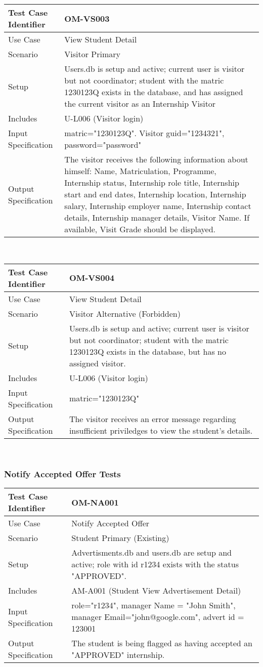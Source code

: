 \documentclass{l3deliverable}
\begin{document}
\begin{tabular}{lp{10cm}}
\hline 
\textbf{Test Case Identifier} & OM-VS003\tabularnewline
\hline 
\hline 
Use Case & View Student Detail \tabularnewline
\hline 
Scenario & Visitor Primary \tabularnewline
\hline 
Setup & Users.db is setup and active; current user is visitor but not coordinator; student with the matric 1230123Q exists in the database, and has assigned the current visitor as an Internship Visitor \tabularnewline
\hline 
Includes & U-L006 (Visitor login) \tabularnewline
\hline 
Input Specification & matric="1230123Q". Visitor guid="1234321", password="password" \tabularnewline
\hline 
Output Specification & The visitor receives the following information about himself: Name, Matriculation, Programme, Internship status, Internship role title, Internship start and end dates, Internship location, Internship salary, Internship employer name, Internship contact details, Internship manager details, Visitor Name. If available, Visit Grade should be displayed.\tabularnewline
\hline 
\end{tabular}\\

\begin{tabular}{lp{10cm}}
\hline 
\textbf{Test Case Identifier} & OM-VS004\tabularnewline
\hline 
\hline 
Use Case & View Student Detail \tabularnewline
\hline 
Scenario & Visitor Alternative (Forbidden) \tabularnewline
\hline 
Setup & Users.db is setup and active; current user is visitor but not coordinator; student with the matric 1230123Q exists in the database, but has no assigned visitor. \tabularnewline
\hline 
Includes & U-L006 (Visitor login) \tabularnewline
\hline 
Input Specification & matric="1230123Q" \tabularnewline
\hline 
Output Specification & The visitor receives an error message regarding insufficient priviledges to view the student's details.\tabularnewline
\hline 
\end{tabular}\\

\subsubsection{Notify Accepted Offer Tests}

\begin{tabular}{lp{10cm}}
\hline 
\textbf{Test Case Identifier} & OM-NA001\tabularnewline
\hline 
\hline 
Use Case & Notify Accepted Offer \tabularnewline
\hline 
Scenario & Student Primary (Existing) \tabularnewline
\hline 
Setup & Advertisments.db and users.db are setup and active; role with id r1234 exists with the status "APPROVED".\tabularnewline
\hline 
Includes & AM-A001 (Student View Advertisement Detail) \tabularnewline
\hline 
Input Specification & role="r1234", manager Name = "John Smith", manager Email="john@google.com", advert id = 123001 \tabularnewline
\hline 
Output Specification & The student is being flagged as having accepted an "APPROVED" internship.\tabularnewline
\hline 
\end{tabular}\\
\end{document}
